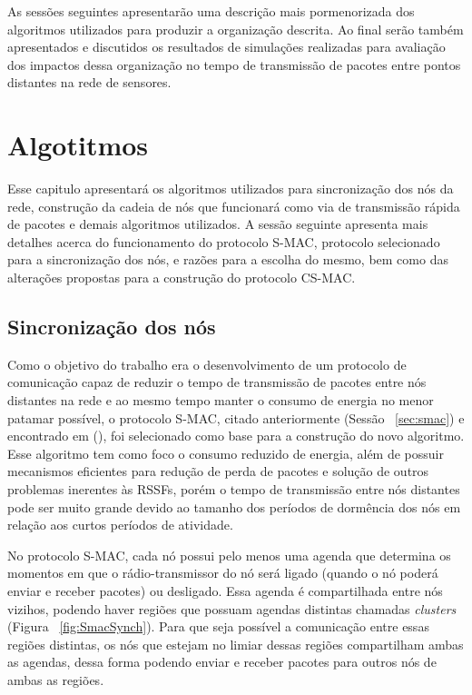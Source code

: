 As sessões seguintes apresentarão uma descrição mais pormenorizada dos algoritmos utilizados para produzir a organização descrita. Ao final serão também apresentados e discutidos os resultados de simulações realizadas para avaliação dos impactos dessa organização no tempo de transmissão de pacotes entre pontos distantes na rede de sensores.

\section{Algotitmos}

Esse capitulo apresentará os algoritmos utilizados para sincronização dos nós da rede, construção da  cadeia de nós que funcionará como via de transmissão rápida de pacotes e demais algoritmos utilizados. A sessão seguinte apresenta mais detalhes acerca do funcionamento do protocolo S-MAC, protocolo selecionado para a sincronização dos nós, e razões para a escolha do mesmo, bem como das alterações propostas para a construção do protocolo CS-MAC.

\subsection{Sincronização dos nós}

Como o objetivo do trabalho era o desenvolvimento de um protocolo de comunicação capaz de reduzir o tempo de transmissão de pacotes entre nós distantes na rede e ao mesmo tempo manter o consumo de energia no menor patamar possível, o protocolo S-MAC, citado anteriormente (Sessão ~\ref{sec:smac}) e encontrado em  (\citeyear{ye04}), foi selecionado como base para a construção do novo algoritmo. Esse algoritmo tem como foco o consumo reduzido de energia, além de possuir mecanismos eficientes para redução de perda de pacotes e solução de outros problemas inerentes às RSSFs, porém o tempo de transmissão entre nós distantes pode ser muito grande devido ao tamanho dos períodos de dormência dos nós em relação aos curtos períodos de atividade.

No protocolo S-MAC, cada nó possui pelo menos uma agenda que determina os momentos em que o rádio-transmissor do nó será ligado (quando o nó poderá enviar e receber pacotes) ou desligado. Essa agenda é compartilhada entre nós vizihos, podendo haver regiões que possuam agendas distintas chamadas \emph{clusters} (Figura ~\ref{fig:SmacSynch}). Para que seja possível a comunicação entre essas regiões distintas, os nós que estejam no limiar dessas regiões compartilham ambas as agendas, dessa forma podendo enviar e receber pacotes para outros nós de ambas as regiões.

